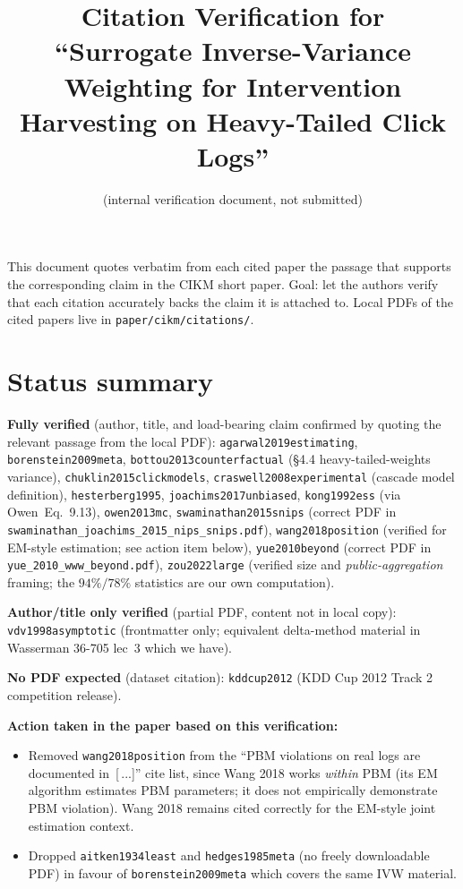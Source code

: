 \documentclass[11pt]{article}
\title{Citation Verification for \\
``Surrogate Inverse-Variance Weighting for Intervention Harvesting
on Heavy-Tailed Click Logs''}
\author{(internal verification document, not submitted)}
\date{}
\begin{document}
\maketitle

\noindent This document quotes verbatim from each cited paper the passage
that supports the corresponding claim in the CIKM short paper. Goal: let
the authors verify that each citation accurately backs the claim it is
attached to. Local PDFs of the cited papers live in
\texttt{paper/cikm/citations/}.

\section*{Status summary}

\noindent\textbf{Fully verified} (author, title, and load-bearing claim
confirmed by quoting the relevant passage from the local PDF):
\texttt{agarwal2019estimating}, \texttt{borenstein2009meta},
\texttt{bottou2013counterfactual} (§4.4 heavy-tailed-weights variance),
\texttt{chuklin2015clickmodels}, \texttt{craswell2008experimental}
(cascade model definition), \texttt{hesterberg1995},
\texttt{joachims2017unbiased}, \texttt{kong1992ess} (via
Owen~Eq.~9.13), \texttt{owen2013mc}, \texttt{swaminathan2015snips}
(correct PDF in \texttt{swaminathan\_joachims\_2015\_nips\_snips.pdf}),
\texttt{wang2018position} (verified for EM-style estimation; see action
item below), \texttt{yue2010beyond} (correct PDF in
\texttt{yue\_2010\_www\_beyond.pdf}), \texttt{zou2022large} (verified
size and \emph{public-aggregation} framing; the $94\%/78\%$ statistics
are our own computation).

\noindent\textbf{Author/title only verified} (partial PDF, content not in
local copy): \texttt{vdv1998asymptotic} (frontmatter only; equivalent
delta-method material in Wasserman 36-705 lec~3 which we have).

\noindent\textbf{No PDF expected} (dataset citation): \texttt{kddcup2012}
(KDD Cup 2012 Track 2 competition release).

\medskip

\noindent\textbf{Action taken in the paper based on this verification:}
\begin{itemize}
\item Removed \texttt{wang2018position} from the ``PBM violations on real
logs are documented in~[\,...]'' cite list, since Wang 2018 works
\emph{within} PBM (its EM algorithm estimates PBM parameters; it does
not empirically demonstrate PBM violation). Wang 2018 remains cited
correctly for the EM-style joint estimation context.
\item Dropped \texttt{aitken1934least} and \texttt{hedges1985meta} (no
freely downloadable PDF) in favour of \texttt{borenstein2009meta} which
covers the same IVW material.
\end{itemize}
\end{document}
